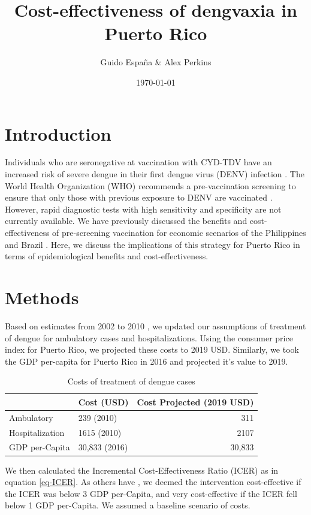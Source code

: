 \documentclass[11pt]{article}
\author{Guido España \& Alex Perkins}
\date{\today}
\title{Cost-effectiveness of dengvaxia in Puerto Rico}
\newcommand{\R}[1]{\label{#1}\linelabel{#1}}
\begin{document}
\maketitle
\linenumbers

\section{Introduction}
\label{sec:orgc62d1d8}
Individuals who are seronegative at vaccination with CYD-TDV have an increased risk of severe dengue in their first dengue virus (DENV) infection \cite{Sridhar2018}. The World Health Organization (WHO) recommends a pre-vaccination screening to ensure that only those with previous exposure to DENV are vaccinated \cite{WHO2018}. However, rapid diagnostic tests with high sensitivity and specificity are not currently available. We have previously discussed the benefits and cost-effectiveness of pre-screening vaccination for economic scenarios of the Philippines and Brazil \cite{Espana2019Biorxiv}. Here, we discuss the implications of this strategy for Puerto Rico in terms of epidemiological benefits and cost-effectiveness.

\section{Methods}
\label{sec:orgd5a8fc2}
Based on estimates from 2002 to 2010 \cite{Halasa2012}, we updated our assumptions of treatment of dengue for ambulatory cases and hospitalizations. Using the consumer price index for Puerto Rico, we projected these costs to 2019 USD. Similarly, we took the GDP per-capita for Puerto Rico in 2016 \cite{worldbank2016} and projected it's value to 2019. 

\begin{table}[htbp]
\caption{\label{tbl-costs}
Costs of treatment of dengue cases}
\centering
\begin{tabular}{llr}
\hline
 & Cost (USD) & Cost Projected (2019 USD)\\
\hline
Ambulatory & 239 (2010) & 311\\
Hospitalization & 1615 (2010) & 2107\\
GDP per-Capita & 30,833 (2016) & 30,833\\
\hline
\end{tabular}
\end{table}




We then calculated the Incremental Cost-Effectiveness Ratio (ICER) as in equation \ref{eq-ICER}. \R{Rev1Com2} As others have \cite{shim2017,shim2017b,flasche2016}, we deemed the intervention cost-effective if the ICER was below 3 GDP per-Capita, and very cost-effective if the ICER fell below 1 GDP per-Capita. We assumed a baseline scenario of costs.
\end{document}
